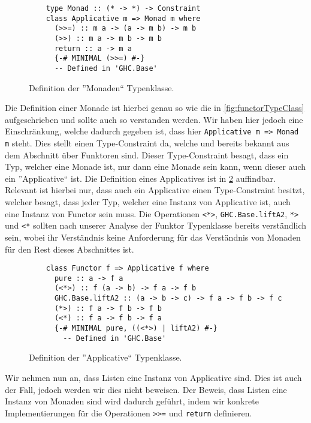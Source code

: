 \documentclass{hhuarticle}
\theoremstyle{definition}
\theoremstyle{theorem}
\begin{document}
  \begin{figure}[h]
    \begin{verbatim}
    type Monad :: (* -> *) -> Constraint
    class Applicative m => Monad m where
      (>>=) :: m a -> (a -> m b) -> m b
      (>>) :: m a -> m b -> m b
      return :: a -> m a
      {-# MINIMAL (>>=) #-}
      -- Defined in 'GHC.Base'
    \end{verbatim}
    \caption{Definition der ''Monaden`` Typenklasse.}%
    \label{fig:MonadeDef}
  \end{figure}

  Die Definition einer Monade ist hierbei genau so wie die in
  \cref{fig:functorTypeClass} aufgeschrieben und sollte auch so
  verstanden werden. Wir haben hier jedoch eine Einschränkung,
  welche dadurch gegeben ist, dass hier \verb|Applicative m => Monad m|
  steht. Dies stellt einen Type-Constraint da, welche
  und bereits bekannt aus dem Abschnitt über Funktoren sind.
  Dieser Type-Constraint besagt, dass ein Typ, welcher eine Monade
  ist, nur dann eine Monade sein kann, wenn dieser auch ein ''Applicative`` ist.
  Die Definition eines Applicatives ist in \cref{fig:ApplicativeDef}
  auffindbar. Relevant ist hierbei nur, dass auch ein Applicative einen
  Type-Constraint besitzt, welcher besagt, dass jeder Typ, welcher
  eine Instanz von Applicative ist, auch eine Instanz von Functor
  sein muss. Die Operationen \verb|<*>|, \verb|GHC.Base.liftA2|,  \verb|*>| 
  und \verb|<*| sollten nach unserer Analyse der Funktor Typenklasse bereits
  verständlich sein, wobei ihr Verständnis keine Anforderung
  für das Verständnis von Monaden für den Rest dieses Abschnittes ist.

  \begin{figure}[h]
    \begin{verbatim}
    class Functor f => Applicative f where
      pure :: a -> f a
      (<*>) :: f (a -> b) -> f a -> f b
      GHC.Base.liftA2 :: (a -> b -> c) -> f a -> f b -> f c
      (*>) :: f a -> f b -> f b
      (<*) :: f a -> f b -> f a
      {-# MINIMAL pure, ((<*>) | liftA2) #-}
        -- Defined in 'GHC.Base'
    \end{verbatim}
    \caption{Definition der ''Applicative`` Typenklasse.}%
    \label{fig:ApplicativeDef}
  \end{figure}

  Wir nehmen nun an, dass Listen eine Instanz von Applicative sind.
  Dies ist auch der Fall, jedoch werden wir dies nicht beweisen. Der
  Beweis, dass Listen eine Instanz von Monaden sind wird dadurch geführt,
  indem wir konkrete Implementierungen für die Operationen
  \verb|>>=| und \verb|return| definieren.
\end{document}
